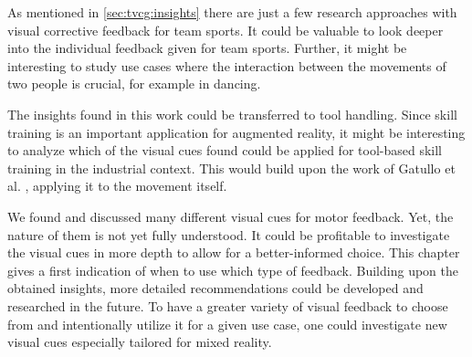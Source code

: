 As mentioned in \autoref{sec:tvcg:insights} there are just a few research approaches with visual corrective feedback for team sports. It could be valuable to look deeper into the individual feedback given for team sports. Further, it might be interesting to study use cases where the interaction between the movements of two people is crucial, for example in dancing.

The insights found in this work could be transferred to tool handling. Since skill training is an important application for augmented reality, it might be interesting to analyze which of the visual cues found could be applied for tool-based skill training in the industrial context. This would build upon the work of Gatullo et al. \cite{gatullo2020whw}, applying it to the movement itself.

We found and discussed many different visual cues for motor feedback. Yet, the nature of them is not yet fully understood. It could be profitable to investigate the visual cues in more depth to allow for a better-informed choice. This chapter gives a first indication of when to use which type of feedback. Building upon the obtained insights, more detailed recommendations could be developed and researched in the future. To have a greater variety of visual feedback to choose from and intentionally utilize it for a given use case, one could investigate new visual cues especially tailored for mixed reality.

